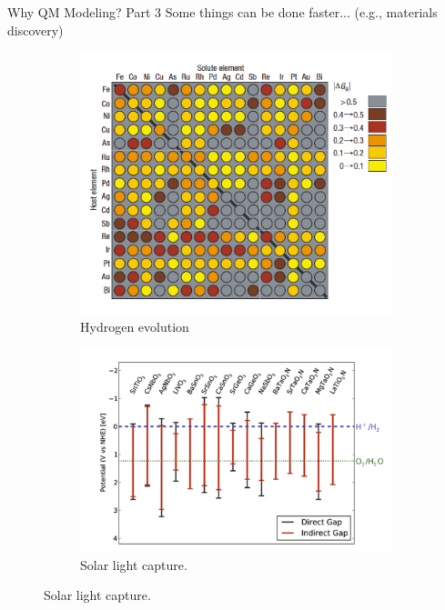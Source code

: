 \documentclass[aspectratio=169]{beamer}
\begin{document}
    \begin{frame}{Why QM Modeling? Part 3}
        Some things can be done faster... (e.g., materials discovery)
        \begin{figure}
            \centering
            \begin{subfigure}{0.23\linewidth}
                \includegraphics[width=\linewidth]{lectures/figures/0.5_HER.png}
                \caption{Hydrogen evolution\cite{greeleyComputationalHighthroughputScreening2006}}
            \end{subfigure}
            \begin{subfigure}{0.23\linewidth}
                \includegraphics[width=\linewidth]{lectures/figures/0.5_Solar.png}
                \caption{Solar light capture\cite{castelliComputationalScreeningPerovskite2012}.}

\end{subfigure}
\end{figure}
\end{frame}
\end{document}
